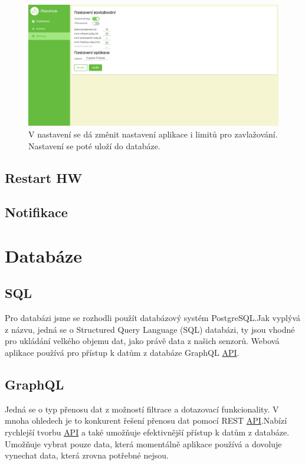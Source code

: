 \documentclass[12pt,a4paper]{article}
\begin{document}
\begin{figure}[h]
	\centering
	\includegraphics[width=\linewidth]{web-ui-settings.png}
	\caption{V nastavení se dá změnit nastavení aplikace i limitů pro
		zavlažování. Nastavení se poté uloží do databáze.}
\end{figure}

\subsection{Restart HW}
\subsection{Notifikace}

\clearpage

\section{Databáze}

\subsection{SQL}

Pro databázi jsme se rozhodli použít databázový systém PostgreSQL.\@ Jak vyplývá z názvu, jedná se o Structured Query Language (SQL) databázi, ty jsou vhodné pro ukládání velkého objemu dat, jako právě data z našich senzorů. Webová aplikace používá pro přístup k datům z databáze \ac{GraphQL} \space \underline{\ac{API}}.\@

\subsection{GraphQL}

Jedná se o typ přenosu dat z možností filtrace a dotazovací funkcionality. V mnoha ohledech je to konkurent řešení přenosu dat pomocí \ac{REST} \space \underline{\ac{API}}.\@ Nabízí rychlejší tvorbu \underline{\ac{API}} \space a také umožňuje efektivnější přístup k datům z databáze. Umožňuje vybrat pouze data, která momentálně aplikace používá a dovoluje vynechat data, která zrovna potřebné nejsou.
\end{document}
